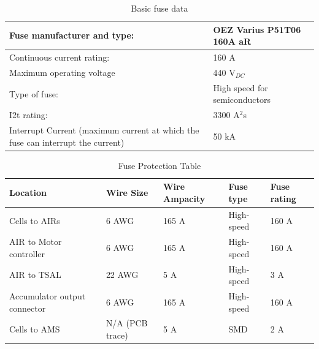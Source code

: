 \begin{table}[H]
	\centering
	\caption{Basic fuse data}
	\begin{tabularx}{\textwidth}{|X|X|}
		\hline
		Fuse manufacturer and type: & OEZ Varius P51T06 160A aR \\[\TableSize]
		\hline
		Continuous current rating:  & 160 A \\[\TableSize]
		\hline
		Maximum operating voltage  & 440 V$_{DC}$ \\[\TableSize]
		\hline
		Type of fuse: & High speed for semiconductors \\[\TableSize]
		\hline
		I2t rating: & 3300 A$^{2}$s \\[\TableSize]
		\hline
		Interrupt Current (maximum current at which the fuse can interrupt the current) & 50 kA \\[\TableSize]
		\hline
	\end{tabularx}%
	\label{tab:acc-fuse}%
\end{table}%



\begin{table}[H]
	\centering
	\caption{Fuse Protection Table}
	\begin{tabularx}{\textwidth}{|X|X|X|X|X|}
		\hline
		Location & Wire Size & Wire Ampacity & Fuse type & Fuse rating\\[\TableSize]
		\hline
		Cells to AIRs & 6 AWG & 165 A & High-speed & 160 A \\[\TableSize]
		\hline
		AIR to Motor controller & 6 AWG & 165 A & High-speed & 160 A \\[\TableSize]
		\hline
		AIR to TSAL & 22 AWG & 5 A & High-speed & 3 A \\[\TableSize]
		\hline
		Accumulator output connector & 6 AWG & 165 A & High-speed  & 160 A \\[\TableSize]
		\hline
		Cells to AMS & N/A (PCB trace) & 5 A    & SMD    & 2 A \\[\TableSize]
		\hline
	\end{tabularx}%
	\label{tab:acc-fuse-protection}%
\end{table}%

